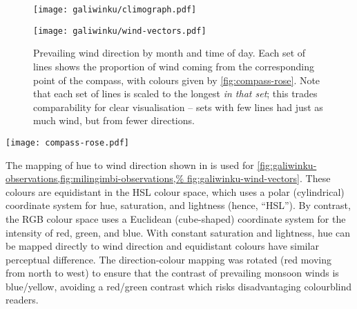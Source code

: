 \begin{figure}[p]
    \centering
    \texttt{[image: galiwinku/climograph.pdf]}
    \caption[Monthly climograph for Galiwinku]{
        Monthly summary of climate statistics at Galiwinku, showing the per-day
        mean for each month.  Rainfall (vertical bars), maximum temperature
        (solid line), minimum temperature (dashed line), and  dewpoint
        temperature (dotted line).  Dewpoint temperature is a measure of humidity.}
    \label{fig:galiwinku-climograph}
\vspace{1cm}
    \centering
    \texttt{[image: galiwinku/wind-vectors.pdf]}
    \caption[Monthly wind vector summary for Galiwinku]{
        Prevailing wind direction by month and time of day.  Each set of
        lines shows the proportion of wind coming from the corresponding
        point of the compass, with colours given by \cref{fig:compass-rose}.
        Note that each set of lines is scaled to the longest \textit{in
        that set}; this trades comparability for clear visualisation --
        sets with few lines had just as much wind, but from fewer directions.
        }
    \label{fig:galiwinku-wind-vectors}
\end{figure}

\begin{SCfigure}[][b]
    \texttt{[image: compass-rose.pdf]}
    \caption[Compass rose mapping colour to wind direction]{
        The mapping of hue to wind direction used for
        \cref{fig:galiwinku-observations,fig:milingimbi-observations,%
        fig:galiwinku-wind-vectors}.  These colours are equidistant in
        the HSL colour space, with constant saturation and lightness.}
    \label{fig:compass-rose}
\end{SCfigure}

The mapping of hue to wind direction shown in  is
used for \cref{fig:galiwinku-observations,fig:milingimbi-observations,%
fig:galiwinku-wind-vectors}.  These colours are equidistant in the HSL colour space,
which uses a polar (cylindrical) coordinate system for hue, saturation,
and lightness (hence, ``HSL'').  By contrast, the RGB colour space uses
a Euclidean (cube-shaped) coordinate system for the intensity of red,
green, and blue.  With constant saturation and lightness,
hue can be mapped directly to wind direction and equidistant colours
have similar perceptual difference.
%
The direction-colour mapping was rotated (red moving from north to west)
to ensure that the contrast of prevailing monsoon winds is blue/yellow,
avoiding a red/green contrast which risks disadvantaging colourblind readers.

